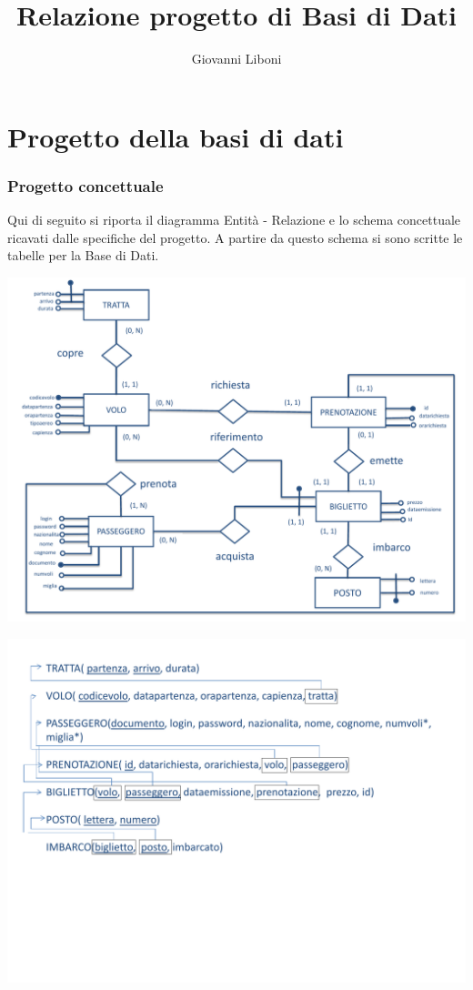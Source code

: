 \documentclass[a4paper,10pt]{article}
\title{Relazione progetto di Basi di Dati}
\author{Giovanni Liboni}
\begin{document}
\begin{frontespizio}



\end{frontespizio}

\tableofcontents

\newpage

\part{Progetto della basi di dati}

\section{Progetto concettuale}
Qui di seguito si riporta il diagramma Entit\`a - Relazione e lo schema concettuale ricavati dalle specifiche del progetto.
A partire da questo schema si sono scritte le tabelle per la Base di Dati.

\includegraphics[scale=0.5]{er.pdf}

\includegraphics[scale=0.6]{schemalogico.pdf}
\end{document}
